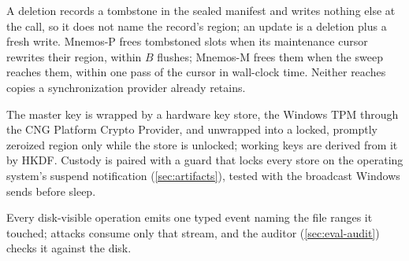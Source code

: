 A deletion records a tombstone in the sealed manifest and writes nothing else at the call, so it
does not name the record's region; an update is a deletion plus a fresh write. Mnemos-P frees
tombstoned slots when its maintenance cursor rewrites their region, within $B$ flushes; Mnemos-M
frees them when the sweep reaches them, within one pass of the cursor in wall-clock time. Neither
reaches copies a synchronization provider already retains.

The master key is wrapped by a hardware key store, the Windows TPM through the CNG Platform Crypto
Provider, and unwrapped into a locked, promptly zeroized region only while the store is unlocked;
working keys are derived from it by HKDF. Custody is paired with a guard that locks every store on
the operating system's suspend notification (\cref{sec:artifacts}), tested with the broadcast
Windows sends before sleep.

Every disk-visible operation emits one typed event naming the file ranges it touched; attacks
consume only that stream, and the auditor (\cref{sec:eval-audit}) checks it against the disk.
